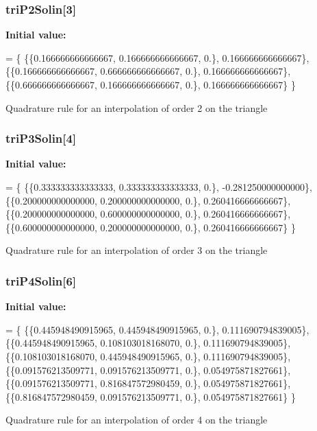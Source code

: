 \subsubsection[{tri\-P2\-Solin}]{ tri\-P2\-Solin[3]}\label{GaussQuadratureTri_8cc_ad1c74b1d13a90edd7851fd6d9713ac34}
{\bfseries Initial value\-:}
\begin{DoxyCode}
= \{
  \{\{0.166666666666667, 0.166666666666667, 0.\}, 0.166666666666667\},
  \{\{0.166666666666667, 0.666666666666667, 0.\}, 0.166666666666667\},
  \{\{0.666666666666667, 0.166666666666667, 0.\}, 0.166666666666667\}
\}
\end{DoxyCode}
Quadrature rule for an interpolation of order 2 on the triangle 
\subsubsection[{tri\-P3\-Solin}]{ tri\-P3\-Solin[4]}\label{GaussQuadratureTri_8cc_a2d7d9ecfa22a260b380c9f2f41e70c69}
{\bfseries Initial value\-:}
\begin{DoxyCode}
= \{
  \{\{0.333333333333333, 0.333333333333333, 0.\}, -0.281250000000000\},
  \{\{0.200000000000000, 0.200000000000000, 0.\}, 0.260416666666667\},
  \{\{0.200000000000000, 0.600000000000000, 0.\}, 0.260416666666667\},
  \{\{0.600000000000000, 0.200000000000000, 0.\}, 0.260416666666667\}
\}
\end{DoxyCode}
Quadrature rule for an interpolation of order 3 on the triangle 
\subsubsection[{tri\-P4\-Solin}]{ tri\-P4\-Solin[6]}\label{GaussQuadratureTri_8cc_a453290b805c63461ef585e9d5926bf28}
{\bfseries Initial value\-:}
\begin{DoxyCode}
= \{
  \{\{0.445948490915965, 0.445948490915965, 0.\}, 0.111690794839005\},
  \{\{0.445948490915965, 0.108103018168070, 0.\}, 0.111690794839005\},
  \{\{0.108103018168070, 0.445948490915965, 0.\}, 0.111690794839005\},
  \{\{0.091576213509771, 0.091576213509771, 0.\}, 0.054975871827661\},
  \{\{0.091576213509771, 0.816847572980459, 0.\}, 0.054975871827661\},
  \{\{0.816847572980459, 0.091576213509771, 0.\}, 0.054975871827661\}
\}
\end{DoxyCode}
Quadrature rule for an interpolation of order 4 on the triangle 
